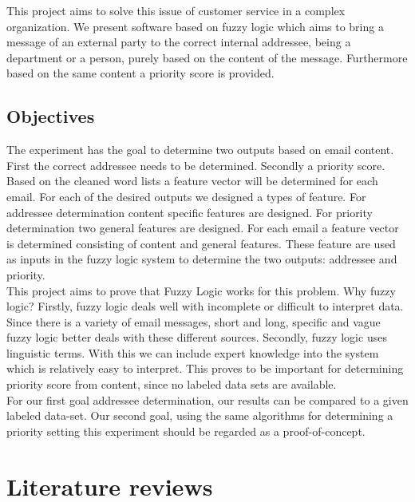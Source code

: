 \documentclass[journal]{IEEEtran}
\begin{document}
This project aims to solve this issue of customer service in a complex organization. We present software based on fuzzy logic which aims to bring a message of an external party to the correct internal addressee, being a department or a person, purely based on the content of the message. Furthermore based on the same content a priority score is provided.

\subsection{Objectives}

The experiment has the goal to determine two outputs based on email content. First the correct addressee needs to be determined. Secondly a priority score. Based on the cleaned word lists a feature vector will be determined for each email. For each of the desired outputs we designed a types of feature. For addressee determination content specific features are designed. For priority determination two general features are designed. For each email a feature vector is determined consisting of content and general features. These feature are used as inputs in the fuzzy logic system to determine the two outputs: addressee and priority. \\

This project aims to prove that Fuzzy Logic works for this problem. Why fuzzy logic? Firstly, fuzzy logic deals well with incomplete or difficult to interpret data. Since there is a variety of email messages, short and long, specific and vague fuzzy logic better deals with these different sources. Secondly, fuzzy logic uses linguistic terms. With this we can include expert knowledge into the system which is relatively easy to interpret. This proves to be important for determining priority score from content, since no labeled data sets are available. \\

For our first goal addressee determination, our results can be compared to a given labeled data-set. Our second goal, using the same algorithms for determining a priority setting this experiment should be regarded as a proof-of-concept.  

\section{Literature reviews}
\end{document}
